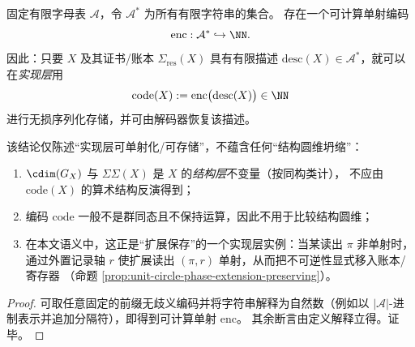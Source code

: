 \begin{proposition}
\label{prop:impl-coding}
固定有限字母表 \(\mathcal{A}\)，令 \(\mathcal{A}^\ast\) 为所有有限字符串的集合。
存在一个可计算单射编码
\[
\mathrm{enc}:\mathcal{A}^\ast \hookrightarrow \NN.
\]
因此：只要 \(X\) 及其证书/账本 \(\Sigma_{\mathrm{res}}(X)\) 具有有限描述
\(\mathrm{desc}(X)\in\mathcal{A}^\ast\)，就可以在\emph{实现层}用
\[
\mathrm{code}(X):=\mathrm{enc}\bigl(\mathrm{desc}(X)\bigr)\in\NN
\]
进行无损序列化存储，并可由解码器恢复该描述。
\par
该结论仅陈述“实现层可单射化/可存储”，不蕴含任何“结构圆维坍缩”：
\begin{enumerate}
  \item \(\cdim(G_X)\) 与 \(\Sigma\Sigma(X)\) 是 \(X\) 的\emph{结构层}不变量（按同构类计），
        不应由 \(\mathrm{code}(X)\) 的算术结构反演得到；
  \item 编码 \(\mathrm{code}\) 一般不是群同态且不保持运算，因此不用于比较结构圆维；
  \item 在本文语义中，这正是“扩展保存”的一个实现层实例：当某读出 \(\pi\) 非单射时，
        通过外置记录轴 \(r\) 使扩展读出 \((\pi,r)\) 单射，从而把不可逆性显式移入账本/寄存器
        （命题 \ref{prop:unit-circle-phase-extension-preserving}）。
\end{enumerate}
\end{proposition}
\begin{proof}
可取任意固定的前缀无歧义编码并将字符串解释为自然数（例如以 \(|\mathcal A|\)-进制表示并追加分隔符），即得到可计算单射 \(\mathrm{enc}\)。
其余断言由定义解释立得。证毕。
\end{proof}

